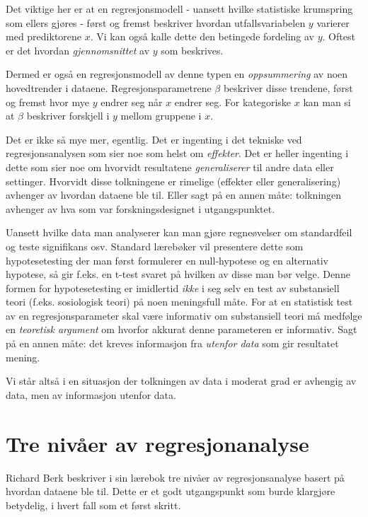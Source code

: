 \documentclass[
  letterpaper,
  DIV=11,
  numbers=noendperiod]{scrreprt}
\begin{document}
Det viktige her er at en regresjonsmodell - uansett hvilke statistiske
krumspring som ellers gjøres - først og fremst beskriver hvordan
utfallsvariabelen \(y\) varierer med prediktorene \(x\). Vi kan også
kalle dette den betingede fordeling av \(y\). Oftest er det hvordan
\emph{gjennomsnittet} av \(y\) som beskrives.

Dermed er også en regresjonsmodell av denne typen en \emph{oppsummering}
av noen hovedtrender i dataene. Regresjonsparametrene \(\beta\)
beskriver disse trendene, først og fremst hvor mye \(y\) endrer seg når
\(x\) endrer seg. For kategoriske \(x\) kan man si at \(\beta\)
beskriver forskjell i \(y\) mellom gruppene i \(x\).

Det er ikke så mye mer, egentlig. Det er ingenting i det tekniske ved
regresjonsanalysen som sier noe som helst om \emph{effekter}. Det er
heller ingenting i dette som sier noe om hvorvidt resultatene
\emph{generaliserer} til andre data eller settinger. Hvorvidt disse
tolkningene er rimelige (effekter eller generalisering) avhenger av
hvordan dataene ble til. Eller sagt på en annen måte: tolkningen
avhenger av hva som var forskningsdesignet i utgangspunktet.

Uansett hvilke data man analyserer kan man gjøre regneøvelser om
standardfeil og teste signifikans osv. Standard lærebøker vil presentere
dette som hypotesetesting der man først formulerer en null-hypotese og
en alternativ hypotese, så gir f.eks. en t-test svaret på hvilken av
disse man bør velge. Denne formen for hypotesetesting er imidlertid
\emph{ikke} i seg selv en test av substansiell teori (f.eks. sosiologisk
teori) på noen meningsfull måte. For at en statistisk test av en
regresjonsparameter skal være informativ om substansiell teori må
medfølge en \emph{teoretisk argument} om hvorfor akkurat denne
parameteren er informativ. Sagt på en annen måte: det kreves informasjon
fra \emph{utenfor data} som gir resultatet mening.

Vi står altså i en situasjon der tolkningen av data i moderat grad er
avhengig av data, men av informasjon utenfor data.

\hypertarget{tre-nivuxe5er-av-regresjonanalyse}{%
\section{Tre nivåer av
regresjonanalyse}\label{tre-nivuxe5er-av-regresjonanalyse}}

Richard Berk beskriver i sin lærebok tre nivåer av regresjonsanalyse
basert på hvordan dataene ble til. Dette er et godt utgangspunkt som
burde klargjøre betydelig, i hvert fall som et først skritt.
\end{document}
